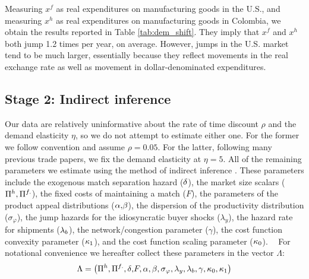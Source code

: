 \documentclass[12pt,titlepage]{article}
\begin{document}
Measuring $x^{f}$ as real expenditures on manufacturing goods in the U.S.,
and measuring $x^{h}$ as real expenditures on manufacturing goods in
Colombia, we obtain the results reported in Table \ref{tab:dem_shift}.%
\footnotemark{} They imply that $x^{f}$ and $x^{h}$ both jump 1.2 times per year, on
average. However, jumps in the U.S. market tend to be much larger,
essentially because they reflect movements in the real exchange rate as well
as movement in dollar-denominated expenditures.

\subsection{Stage 2: Indirect inference}

Our data are relatively uninformative about the rate of time discount $\rho $
and the demand elasticity $\eta $, so we do not attempt to estimate either
one$.$ For the former we follow convention and assume $\rho =0.05$. For the
latter, following many previous trade papers, we fix the demand elasticity
at $\eta =5.$ All of the remaining parameters we estimate using the method
of indirect inference \citep{gourieroux1997simulation}. These parameters
include the exogenous match separation hazard (${\small \delta }$), the
market size scalars (${\small \Pi }^{h},{\small \Pi }^{f.}$), the fixed
costs of maintaining a match ($F$), the parameters of the product appeal
distributions (${\small \alpha }{\small ,}{\small \beta }$), the dispersion
of the productivity distribution ($\sigma _{\varphi }$), the jump hazards
for the idiosyncratic buyer shocks ($\lambda _{y}$), the hazard rate for
shipments (${\small \lambda }_{b}$), the network/congestion parameter ($%
\gamma $), the cost function convexity parameter (${\small \kappa _{1}}$),
and the cost function scaling parameter (${\small \kappa _{0}}$). \textbf{\ }%
For notational convenience we hereafter collect these parameters in the
vector $\Lambda :$%
\begin{equation*}
\Lambda =\left( {\small \Pi }^{h},{\small \Pi }^{f.},{\small \delta ,}F,%
{\small \alpha },{\small \beta },\sigma _{\varphi },\lambda _{y},{\small %
\lambda }_{b},{\small \gamma ,\kappa _{0},\kappa _{1}}\right)
\end{equation*}
\end{document}
